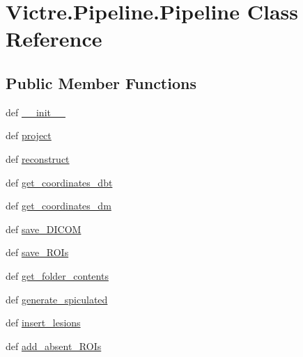 \hypertarget{classVictre_1_1Pipeline_1_1Pipeline}{\section{Victre.\-Pipeline.\-Pipeline Class Reference}
\label{classVictre_1_1Pipeline_1_1Pipeline}
}
\subsection*{Public Member Functions}
\begin{DoxyCompactItemize}
\item 
def \hyperlink{classVictre_1_1Pipeline_1_1Pipeline_a45627045131474e1dc8c218655aee2b2}{\-\_\-\-\_\-init\-\_\-\-\_\-}
\item 
def \hyperlink{classVictre_1_1Pipeline_1_1Pipeline_a372ba5d565da4224e4768316ac640f99}{project}
\item 
def \hyperlink{classVictre_1_1Pipeline_1_1Pipeline_ab7dbcc6b27ab4e563391e2d76045f609}{reconstruct}
\item 
def \hyperlink{classVictre_1_1Pipeline_1_1Pipeline_a27d92d6338fea609839441a7f644ae41}{get\-\_\-coordinates\-\_\-dbt}
\item 
def \hyperlink{classVictre_1_1Pipeline_1_1Pipeline_a404619920d58648ef74e6307d8b6a7dc}{get\-\_\-coordinates\-\_\-dm}
\item 
def \hyperlink{classVictre_1_1Pipeline_1_1Pipeline_a38cf3bb515b5c52d4010867bc3dfc1d0}{save\-\_\-\-D\-I\-C\-O\-M}
\item 
def \hyperlink{classVictre_1_1Pipeline_1_1Pipeline_ab41af48a6a0860907671a80d4d1fffd6}{save\-\_\-\-R\-O\-Is}
\item 
def \hyperlink{classVictre_1_1Pipeline_1_1Pipeline_ae6bc9a133eb885f8aa605ff80fc7f784}{get\-\_\-folder\-\_\-contents}
\item 
def \hyperlink{classVictre_1_1Pipeline_1_1Pipeline_aa63a440812d2bbeec712e6c4f9054f1d}{generate\-\_\-spiculated}
\item 
def \hyperlink{classVictre_1_1Pipeline_1_1Pipeline_aab8f3f01f7247868aecd5bac81323263}{insert\-\_\-lesions}
\item 
def \hyperlink{classVictre_1_1Pipeline_1_1Pipeline_a6ed9f1e6df840d9a5753860de0312272}{add\-\_\-absent\-\_\-\-R\-O\-Is}
\end{DoxyCompactItemize}
